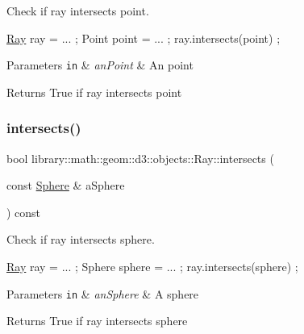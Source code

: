 Check if ray intersects point. 


\begin{DoxyCode}
\hyperlink{classlibrary_1_1math_1_1geom_1_1d3_1_1objects_1_1_ray_a11b7613464daaebc6e25a758b057f203}{Ray} ray = ... ;
Point point = ... ;
ray.intersects(point) ;
\end{DoxyCode}



\begin{DoxyParams}[1]{Parameters}
\mbox{\tt in}  & {\em an\+Point} & An point \\
\hline
\end{DoxyParams}
\begin{DoxyReturn}{Returns}
True if ray intersects point 
\end{DoxyReturn}
\mbox{\label{classlibrary_1_1math_1_1geom_1_1d3_1_1objects_1_1_ray_ab75f38e9f6f0e7160acdf5360089937b}} 
\subsubsection{\texorpdfstring{intersects()}{intersects()}\hspace{0.1cm}{\footnotesize\ttfamily [2/3]}}
{\footnotesize\ttfamily bool library\+::math\+::geom\+::d3\+::objects\+::\+Ray\+::intersects (\begin{DoxyParamCaption}\item[{const \hyperlink{classlibrary_1_1math_1_1geom_1_1d3_1_1objects_1_1_sphere}{Sphere} \&}]{a\+Sphere }\end{DoxyParamCaption}) const}



Check if ray intersects sphere. 


\begin{DoxyCode}
\hyperlink{classlibrary_1_1math_1_1geom_1_1d3_1_1objects_1_1_ray_a11b7613464daaebc6e25a758b057f203}{Ray} ray = ... ;
Sphere sphere = ... ;
ray.intersects(sphere) ;
\end{DoxyCode}



\begin{DoxyParams}[1]{Parameters}
\mbox{\tt in}  & {\em an\+Sphere} & A sphere \\
\hline
\end{DoxyParams}
\begin{DoxyReturn}{Returns}
True if ray intersects sphere 
\end{DoxyReturn}
\mbox{\label{classlibrary_1_1math_1_1geom_1_1d3_1_1objects_1_1_ray_a691d9fda5c22f8cef0b412b9173fe71b}} 
